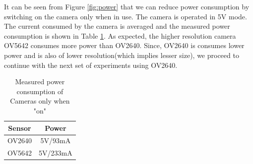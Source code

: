  It can be seen from Figure \ref{fig:power} that we can reduce power consumption by switching on the camera only when in use. The camera is operated in 5V mode. The current consumed by the camera is averaged  and the measured power consumption is shown in Table \ref{tbl:power_cons}. As expected, the higher resolution camera OV5642 consumes more power than OV2640. Since, OV2640 is consumes lower power and is also of lower resolution(which implies lesser size), we proceed to continue with the next set of experiments using OV2640.
\begin{table}[]
\centering
\caption{Measured power consumption of Cameras only when "on"}
\label{tbl:power_cons}
\begin{tabular}{|c|c|}
\hline
Sensor & Power \\
\hline
 OV2640 & 5V/93mA\\
 \hline
 OV5642 & 5V/233mA\\
 \hline
\end{tabular}
\end{table}